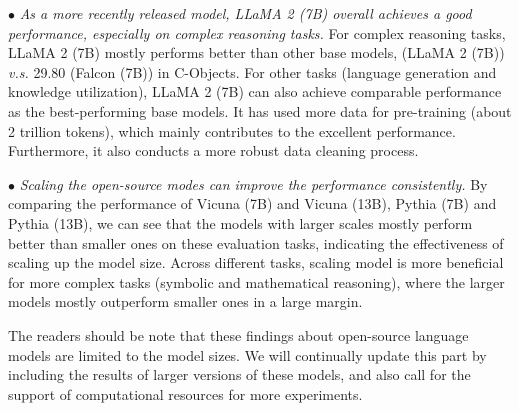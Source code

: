 %

$\bullet$ \emph{As a more recently released model, LLaMA 2 (7B) overall achieves a good  performance, especially on complex reasoning tasks.} 
{For complex reasoning tasks, LLaMA 2 (7B) mostly performs better than other base models,  (LLaMA 2 (7B)) \emph{v.s.} 29.80 (Falcon (7B)) in C-Objects.
For other tasks (\eg language generation and knowledge utilization), LLaMA 2 (7B) can also achieve comparable performance as the best-performing base models. It has used more data for pre-training (\ie about 2 trillion tokens), which mainly contributes to the excellent performance. Furthermore, it also conducts a more robust data cleaning process.}



$\bullet$ \emph{Scaling the open-source modes can improve the performance consistently.} 
{By comparing the performance of Vicuna (7B) and Vicuna (13B), Pythia (7B) and Pythia (13B), we can see that the models with larger scales mostly perform better than smaller ones on these evaluation  tasks, indicating the effectiveness of scaling up the model size. 
Across different tasks, scaling model is more beneficial for more complex tasks (\eg symbolic and mathematical reasoning), where the larger models mostly outperform smaller ones in a large margin.
}


The readers should be note that these findings about open-source language models are  limited to the model sizes. We will continually update this part by including the results of larger versions of these models, and also call for the support of computational resources for more experiments. 